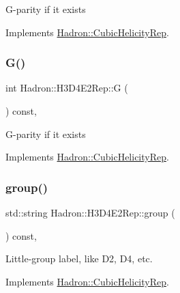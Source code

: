 G-\/parity if it exists 

Implements \mbox{\hyperlink{structHadron_1_1CubicHelicityRep_a50689f42be1e6170aa8cf6ad0597018b}{Hadron\+::\+Cubic\+Helicity\+Rep}}.

\mbox{\label{structHadron_1_1H3D4E2Rep_a90b501cdfc244c792b2fac27a1470b78}} 
\subsubsection{\texorpdfstring{G()}{G()}\hspace{0.1cm}{\footnotesize\ttfamily [2/2]}}
{\footnotesize\ttfamily int Hadron\+::\+H3\+D4\+E2\+Rep\+::G (\begin{DoxyParamCaption}{ }\end{DoxyParamCaption}) const\hspace{0.3cm}{\ttfamily [inline]}, {\ttfamily [virtual]}}

G-\/parity if it exists 

Implements \mbox{\hyperlink{structHadron_1_1CubicHelicityRep_a50689f42be1e6170aa8cf6ad0597018b}{Hadron\+::\+Cubic\+Helicity\+Rep}}.

\mbox{\label{structHadron_1_1H3D4E2Rep_acfd57e0a45fce51a748dfe354f357e8a}} 
\subsubsection{\texorpdfstring{group()}{group()}\hspace{0.1cm}{\footnotesize\ttfamily [1/3]}}
{\footnotesize\ttfamily std\+::string Hadron\+::\+H3\+D4\+E2\+Rep\+::group (\begin{DoxyParamCaption}{ }\end{DoxyParamCaption}) const\hspace{0.3cm}{\ttfamily [inline]}, {\ttfamily [virtual]}}

Little-\/group label, like D2, D4, etc. 

Implements \mbox{\hyperlink{structHadron_1_1CubicHelicityRep_a101a7d76cd8ccdad0f272db44b766113}{Hadron\+::\+Cubic\+Helicity\+Rep}}.

\mbox{\label{structHadron_1_1H3D4E2Rep_acfd57e0a45fce51a748dfe354f357e8a}} 
